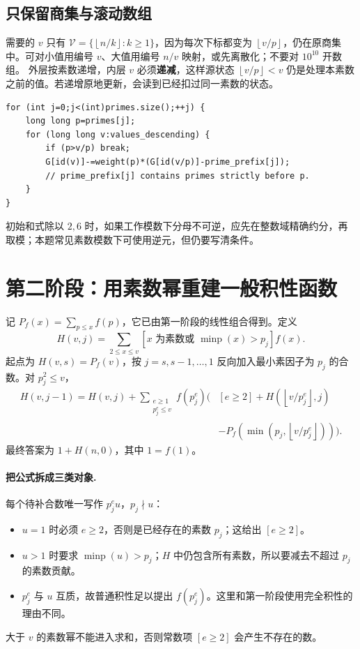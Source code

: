\documentclass[UTF8,a4paper,11pt,twoside,openright,fontset=fandol]{ctexbook}
\theoremstyle{definition}
\newcommand{\floor}[1]{\left\lfloor #1\right\rfloor}
\begin{document}
\subsection{只保留商集与滚动数组}
需要的 $v$ 只有 $\mathcal V=\{\floor{n/k}:k\ge1\}$，因为每次下标都变为 $\floor{v/p}$，仍在原商集中。可对小值用编号 $v$、大值用编号 $n/v$ 映射，或先离散化；不要对 $10^{10}$ 开数组。
外层按素数递增，内层 $v$ 必须\textbf{递减}，这样源状态 $\floor{v/p}<v$ 仍是处理本素数之前的值。若递增原地更新，会读到已经扣过同一素数的状态。
\begin{lstlisting}
for (int j=0;j<(int)primes.size();++j) {
    long long p=primes[j];
    for (long long v:values_descending) {
        if (p>v/p) break;
        G[id(v)]-=weight(p)*(G[id(v/p)]-prime_prefix[j]);
        // prime_prefix[j] contains primes strictly before p.
    }
}
\end{lstlisting}
初始和式除以 $2,6$ 时，如果工作模数下分母不可逆，应先在整数域精确约分，再取模；本题常见素数模数下可使用逆元，但仍要写清条件。


\section{第二阶段：用素数幂重建一般积性函数}
记 $P_f(x)=\sum_{p\le x}f(p)$，它已由第一阶段的线性组合得到。定义
\[
 H(v,j)=\sum_{2\le x\le v}
 [x\text{ 为素数或 }\operatorname{minp}(x)>p_j]f(x).
\]
起点为 $H(v,s)=P_f(v)$，按 $j=s,s-1,\ldots,1$ 反向加入最小素因子为 $p_j$ 的合数。对 $p_j^2\le v$，
\[
\begin{aligned}
 H(v,j-1)=H(v,j)+\sum_{\substack{e\ge1\\p_j^e\le v}} f(p_j^e)
 \biggl(&[e\ge2]+H(\floor{v/p_j^e},j)\\
 &-P_f(\min(p_j,\floor{v/p_j^e}))\biggr).
\end{aligned}
\]
最终答案为 $1+H(n,0)$，其中 $1=f(1)$。


\paragraph{把公式拆成三类对象.}
每个待补合数唯一写作 $p_j^e u$，$p_j\nmid u$：
\begin{itemize}
\item $u=1$ 时必须 $e\ge2$，否则是已经存在的素数 $p_j$；这给出 $[e\ge2]$。
\item $u>1$ 时要求 $\operatorname{minp}(u)>p_j$；$H$ 中仍包含所有素数，所以要减去不超过 $p_j$ 的素数贡献。
\item $p_j^e$ 与 $u$ 互质，故普通积性足以提出 $f(p_j^e)$。这里和第一阶段使用完全积性的理由不同。
\end{itemize}
大于 $v$ 的素数幂不能进入求和，否则常数项 $[e\ge2]$ 会产生不存在的数。
\end{document}
